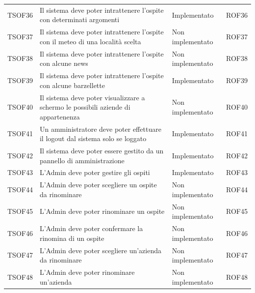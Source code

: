 \documentclass[../PianoDiQualifica_v4.0.0.tex]{subfiles}
\begin{document}
\begin{longtable}[c] { >{\centering\arraybackslash}p{2cm} p{7cm} >{\centering\arraybackslash}p{4cm} >{\centering\arraybackslash}p{2cm}}
			\addlinespace[0.3em]
			\midrule
			\addlinespace[0.3em]
			TSOF36 & Il sistema deve poter intrattenere l'ospite con determinati argomenti & Implementato & ROF36 \\
			\addlinespace[0.3em]
			\midrule
			\addlinespace[0.3em]
			TSOF37 & Il sistema deve poter intrattenere l'ospite con il meteo di una località scelta & Non implementato & ROF37 \\
			\addlinespace[0.3em]
			\midrule
			\addlinespace[0.3em]
			TSOF38 & Il sistema deve poter intrattenere l'ospite con alcune news & Non implementato & ROF38 \\
			\addlinespace[0.3em]
			\midrule
			\addlinespace[0.3em]
			TSOF39 & Il sistema deve poter intrattenere l'ospite con alcune barzellette & Implementato & ROF39 \\
			\addlinespace[0.3em]
			\midrule
			\addlinespace[0.3em]
			TSOF40 & Il sistema deve poter visualizzare a schermo le possibili aziende di appartenenza & Non implementato & ROF40 \\
			\addlinespace[0.3em]
			\midrule
			\addlinespace[0.3em]
			TSOF41 & Un amministratore deve poter effettuare il logout dal sistema solo se loggato	 & Implementato & ROF41 \\
			\addlinespace[0.3em]
			\midrule
			\addlinespace[0.3em]
			TSOF42 & Il sistema deve poter essere gestito da un pannello di amministrazione & Implementato & ROF42 \\
			\addlinespace[0.3em]
			\midrule
			\addlinespace[0.3em]
			TSOF43 & L'Admin deve poter gestire gli ospiti & Implementato & ROF43 \\
			\addlinespace[0.3em]
			\midrule
			\addlinespace[0.3em]
			TSOF44 & L'Admin deve poter scegliere un ospite da rinominare & Non implementato & ROF44 \\
			\addlinespace[0.3em]
			\midrule
			\addlinespace[0.3em]
			TSOF45 & L'Admin deve poter rinominare un ospite & Non implementato & ROF45 \\
			\addlinespace[0.3em]
			\midrule
			\addlinespace[0.3em]
			TSOF46 & L'Admin deve poter confermare la rinomina di un ospite & Non implementato & ROF46 \\
			\addlinespace[0.3em]
			\midrule
			\addlinespace[0.3em]
			TSOF47 & L'Admin deve poter scegliere un'azienda da rinominare & Non implementato & ROF47 \\
			\addlinespace[0.3em]
			\midrule
			\addlinespace[0.3em]
			TSOF48 & L'Admin deve poter rinominare un'azienda & Non implementato & ROF48 \\

\end{longtable}
\end{document}
